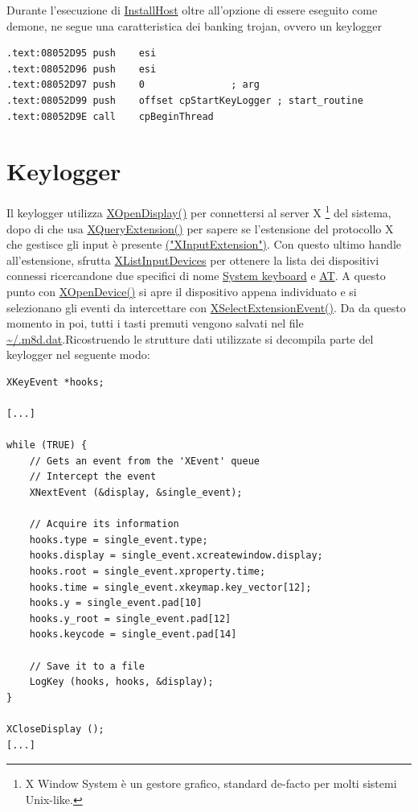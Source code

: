 \documentclass[12pt,oneside]{fithesis2}
\begin{document}
        Durante l'esecuzione di \url{InstallHost} oltre all'opzione di essere eseguito come demone, ne segue una caratteristica dei banking trojan, ovvero un keylogger
        
        \begin{verbatim}        
.text:08052D95 push    esi
.text:08052D96 push    esi
.text:08052D97 push    0               ; arg
.text:08052D99 push    offset cpStartKeyLogger ; start_routine
.text:08052D9E call    cpBeginThread
        \end{verbatim}

        
        
        \section*{Keylogger}
        Il keylogger utilizza \url{XOpenDisplay()} per connettersi al server X
        \footnote{X Window System è un gestore grafico, standard de-facto per molti sistemi Unix-like.}
        del sistema, dopo di che usa \url{XQueryExtension()} per sapere se l'estensione del protocollo X che gestisce gli input è presente \url{("XInputExtension")}. Con questo ultimo handle all'estensione, sfrutta \url{XListInputDevices} per ottenere la lista dei dispositivi connessi ricercandone due specifici di nome \url{System keyboard} e \url{AT}. A questo punto con \url{XOpenDevice()} si apre il dispositivo appena individuato e si selezionano gli eventi da intercettare con \url{XSelectExtensionEvent()}. Da da questo momento in poi, tutti i tasti premuti vengono salvati nel file \url{\~/.m8d.dat}.\newline Ricostruendo le strutture dati utilizzate si decompila parte del keylogger nel seguente modo:\clearpage
\begin{verbatim}
XKeyEvent *hooks;

[...]

while (TRUE) {
    // Gets an event from the 'XEvent' queue
    // Intercept the event
    XNextEvent (&display, &single_event);
    
    // Acquire its information
    hooks.type = single_event.type;
    hooks.display = single_event.xcreatewindow.display;
    hooks.root = single_event.xproperty.time;
    hooks.time = single_event.xkeymap.key_vector[12];
    hooks.y = single_event.pad[10]
    hooks.y_root = single_event.pad[12]
    hooks.keycode = single_event.pad[14]
    
    // Save it to a file
    LogKey (hooks, hooks, &display);
}

XCloseDisplay ();
[...]
\end{verbatim}
\end{document}
